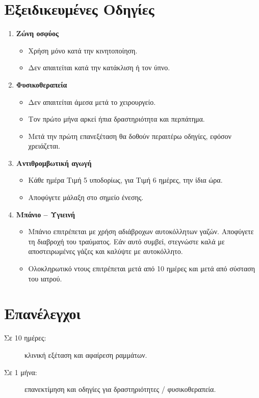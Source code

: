 \documentclass[10pt,greek]{article}
\begin{document}
\section*{Εξειδικευμένες Οδηγίες}
\begin{enumerate}[label=\arabic*.]
  \item \textbf{Ζώνη οσφύος}
      \begin{itemize}
\item Χρήση μόνο κατά την κινητοποίηση.
\item Δεν απαιτείται κατά την κατάκλιση ή τον ύπνο.
    \end{itemize}
  \item \textbf{Φυσικοθεραπεία}
      \begin{itemize}
\item Δεν απαιτείται άμεσα μετά το χειρουργείο.
\item Τον πρώτο μήνα αρκεί ήπια δραστηριότητα και περπάτημα.
\item Μετά την πρώτη επανεξέταση θα δοθούν περαιτέρω οδηγίες, εφόσον χρειάζεται.
    \end{itemize}
  \item \textbf{Αντιθρομβωτική αγωγή}
      \begin{itemize}
\item Κάθε ημέρα Τιμή 5 υποδορίως, για Τιμή 6 ημέρες, την ίδια ώρα.
\item Αποφύγετε μάλαξη στο σημείο ένεσης.
    \end{itemize}
    \item \textbf{Μπάνιο -- Υγιεινή}
        \begin{itemize}
\item Μπάνιο επιτρέπεται με χρήση αδιάβροχων αυτοκόλλητων γαζών. Αποφύγετε τη διαβροχή του τραύματος. Εάν αυτό συμβεί, στεγνώστε καλά με αποστειρωμένες γάζες και καλύψτε με αυτοκόλλητο.
\item Ολοκληρωτικό ντους επιτρέπεται μετά από 10 ημέρες και μετά από σύσταση του ιατρού.
        \end{itemize}
\end{enumerate}

\section*{Επανέλεγχοι}
\begin{description}
\item[Σε 10 ημέρες:] κλινική εξέταση και αφαίρεση ραμμάτων.
\item[Σε 1 μήνα:] επανεκτίμηση και οδηγίες για δραστηριότητες / φυσικοθεραπεία.
\end{description}
\end{document}
